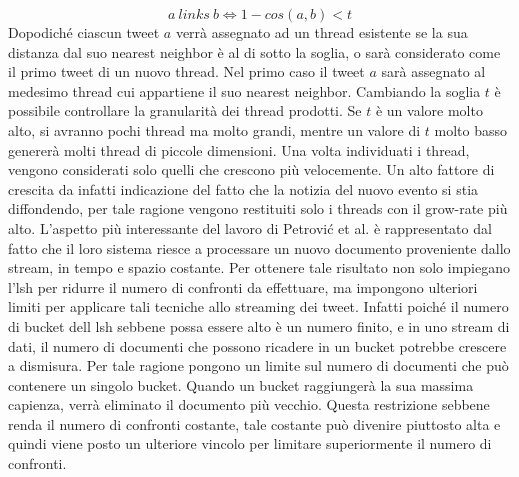 \documentclass[a4paper,12pt]{report}
\begin{document}
 \begin{equation}
  a \ links \ b \Longleftrightarrow 1-cos(a,b)<t
\end{equation}
Dopodiché ciascun tweet $a$  verrà  assegnato ad un thread esistente se la sua distanza dal suo nearest neighbor è al di sotto la soglia, o sarà considerato come il primo tweet di un nuovo thread. Nel primo caso il tweet $a$ sarà assegnato al medesimo thread cui appartiene il suo nearest neighbor. Cambiando la soglia $t$ 
è possibile controllare la granularità dei thread prodotti. Se $t$ è un valore molto alto, si avranno pochi thread ma molto grandi, mentre un valore di $t$ molto basso genererà molti thread di piccole dimensioni.
Una volta individuati i thread, vengono considerati solo quelli che crescono più velocemente. Un alto fattore di crescita da infatti indicazione del fatto che la notizia del nuovo evento si stia diffondendo,  per tale ragione vengono restituiti solo i threads con il grow-rate più alto. L'aspetto più interessante del lavoro di Petrovi\'c et al. \cite{Petrovic:2010:SFS:1857999.1858020} è rappresentato dal fatto che il loro sistema riesce a processare un nuovo documento proveniente dallo stream, in tempo e spazio costante.  Per ottenere tale risultato non solo impiegano l'lsh per ridurre il numero di confronti da effettuare, ma impongono ulteriori limiti per applicare tali tecniche allo streaming dei tweet. Infatti poiché il numero di bucket dell lsh sebbene possa essere alto è un numero finito, e in uno stream di dati, il numero di documenti che possono ricadere in un bucket potrebbe crescere a dismisura. Per tale ragione pongono un limite sul numero di documenti che può contenere un singolo bucket. Quando un bucket raggiungerà la sua massima capienza, verrà eliminato il documento più vecchio. Questa restrizione sebbene renda il numero di confronti costante, tale costante può divenire piuttosto alta e quindi viene posto un ulteriore vincolo per limitare superiormente il numero di confronti. 
\end{document}
